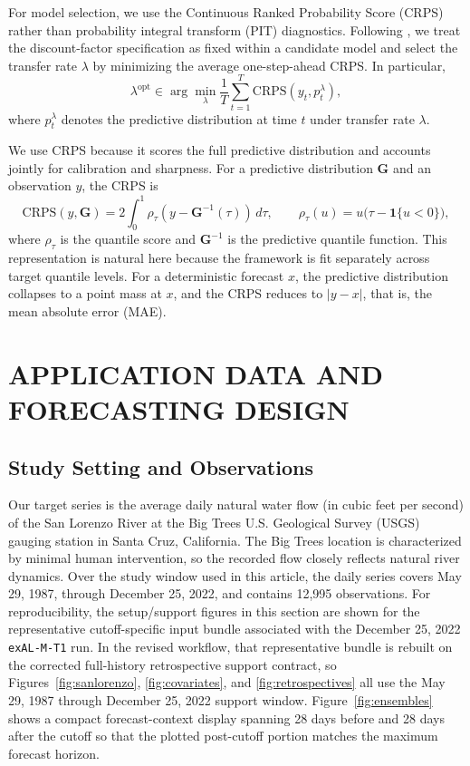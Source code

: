 \documentclass[APA,STIX1COL]{WileyNJD-v2}
\begin{document}
For model selection, we use the Continuous Ranked Probability Score (CRPS) rather than probability integral transform (PIT) diagnostics. Following \citet{barata2021_flex_quantile}, we treat the discount-factor specification as fixed within a candidate model and select the transfer rate \(\lambda\) by minimizing the average one-step-ahead CRPS. In particular,
\[
\lambda^{\text{opt}} \in \arg\min_{\lambda} \frac{1}{T}\sum_{t=1}^T \text{CRPS}(y_t,p_t^{\lambda}),
\]
where \(p_t^{\lambda}\) denotes the predictive distribution at time \(t\) under transfer rate \(\lambda\).

We use CRPS because it scores the full predictive distribution and accounts jointly for calibration and sharpness. For a predictive distribution \(\mathbf{G}\) and an observation \(y\), the CRPS is
\[
\text{CRPS}(y, \mathbf{G}) = 2 \int_0^1 \rho_\tau\!\left(y - \mathbf{G}^{-1}(\tau)\right)\, d\tau,
\qquad
\rho_\tau(u) = u\big(\tau - \mathbf{1}\{u<0\}\big),
\]
where \(\rho_\tau\) is the quantile score and \(\mathbf{G}^{-1}\) is the predictive quantile function. This representation is natural here because the framework is fit separately across target quantile levels. For a deterministic forecast \(x\), the predictive distribution collapses to a point mass at \(x\), and the CRPS reduces to \(|y-x|\), that is, the mean absolute error (MAE).

\section{APPLICATION DATA AND FORECASTING DESIGN}
\label{sec:data}

\subsection{Study Setting and Observations}

Our target series is the average daily natural water flow (in cubic feet per second) of the San Lorenzo River at the Big Trees U.S. Geological Survey (USGS) gauging station in Santa Cruz, California. The Big Trees location is characterized by minimal human intervention, so the recorded flow closely reflects natural river dynamics. Over the study window used in this article, the daily series covers May 29, 1987, through December 25, 2022, and contains 12,995 observations. For reproducibility, the setup/support figures in this section are shown for the representative cutoff-specific input bundle associated with the December 25, 2022 \texttt{exAL-M-T1} run. In the revised workflow, that representative bundle is rebuilt on the corrected full-history retrospective support contract, so Figures~\ref{fig:sanlorenzo}, \ref{fig:covariates}, and \ref{fig:retrospectives} all use the May 29, 1987 through December 25, 2022 support window. Figure~\ref{fig:ensembles} shows a compact forecast-context display spanning 28 days before and 28 days after the cutoff so that the plotted post-cutoff portion matches the maximum forecast horizon.
\end{document}
